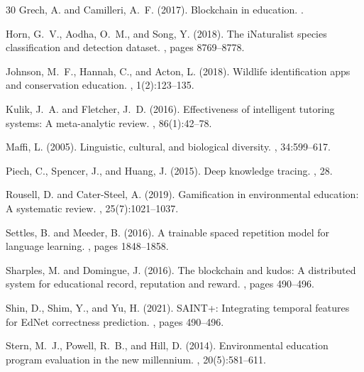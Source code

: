 \documentclass[11pt,a4paper]{article}
\begin{document}
\begin{thebibliography}{30}
Grech, A. and Camilleri, A.~F. (2017).
\newblock Blockchain in education.
.

Horn, G.~V., Aodha, O.~M., and Song, Y. (2018).
\newblock The iNaturalist species classification and detection dataset.
, pages 8769--8778.

Johnson, M.~F., Hannah, C., and Acton, L. (2018).
\newblock Wildlife identification apps and conservation education.
, 1(2):123--135.

Kulik, J.~A. and Fletcher, J.~D. (2016).
\newblock Effectiveness of intelligent tutoring systems: A meta-analytic review.
, 86(1):42--78.

Maffi, L. (2005).
\newblock Linguistic, cultural, and biological diversity.
, 34:599--617.

Piech, C., Spencer, J., and Huang, J. (2015).
\newblock Deep knowledge tracing.
, 28.

Rousell, D. and Cater-Steel, A. (2019).
\newblock Gamification in environmental education: A systematic review.
, 25(7):1021--1037.

Settles, B. and Meeder, B. (2016).
\newblock A trainable spaced repetition model for language learning.
, pages 1848--1858.

Sharples, M. and Domingue, J. (2016).
\newblock The blockchain and kudos: A distributed system for educational record, reputation and reward.
, pages 490--496.

Shin, D., Shim, Y., and Yu, H. (2021).
\newblock SAINT+: Integrating temporal features for EdNet correctness prediction.
, pages 490--496.

Stern, M.~J., Powell, R.~B., and Hill, D. (2014).
\newblock Environmental education program evaluation in the new millennium.
, 20(5):581--611.


\end{thebibliography}
\end{document}
